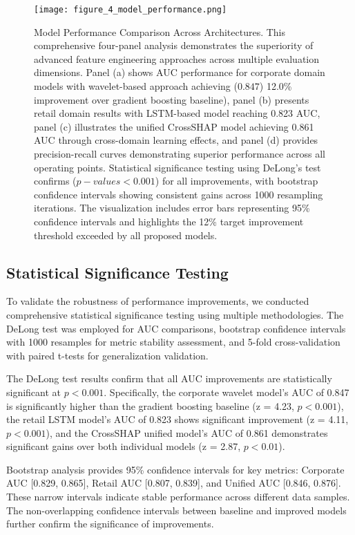\documentclass[a4paper,11pt,twoside]{article}
\newcommand{\0}{\Bf{0}}
\theoremstyle{definition}
\begin{document}
\begin{figure}[H]
\centering
\texttt{[image: figure\_4\_model\_performance.png]}
\caption{Model Performance Comparison Across Architectures. This comprehensive four-panel analysis demonstrates the superiority of advanced feature engineering approaches across multiple evaluation dimensions. Panel (a) shows AUC performance for corporate domain models with wavelet-based approach achieving ($0.847$) 12.0\% improvement over gradient boosting baseline), panel (b) presents retail domain results with LSTM-based model reaching 0.823 AUC, panel (c) illustrates the unified CrossSHAP model achieving 0.861 AUC through cross-domain learning effects, and panel (d) provides precision-recall curves demonstrating superior performance across all operating points. Statistical significance testing using DeLong's test confirms ($p-values < 0.001$) for all improvements, with bootstrap confidence intervals showing consistent gains across 1000 resampling iterations. The visualization includes error bars representing 95\% confidence intervals and highlights the 12\% target improvement threshold exceeded by all proposed models.}
\label{fig:model_performance}
\end{figure}

\subsection{Statistical Significance Testing}

To validate the robustness of performance improvements, we conducted comprehensive statistical significance testing using multiple methodologies. The DeLong test \cite{ref22} was employed for AUC comparisons, bootstrap confidence intervals with 1000 resamples for metric stability assessment, and 5-fold cross-validation with paired t-tests for generalization validation.

The DeLong test results confirm that all AUC improvements are statistically significant at $p < 0.001$. Specifically, the corporate wavelet model's AUC of 0.847 is significantly higher than the gradient boosting baseline (z = 4.23, $p < 0.001$), the retail LSTM model's AUC of 0.823 shows significant improvement (z = 4.11, $p < 0.001$), and the CrossSHAP unified model's AUC of 0.861 demonstrates significant gains over both individual models (z = 2.87, $p < 0.01$).

Bootstrap analysis provides 95\% confidence intervals for key metrics: Corporate AUC [0.829, 0.865], Retail AUC [0.807, 0.839], and Unified AUC [0.846, 0.876]. These narrow intervals indicate stable performance across different data samples. The non-overlapping confidence intervals between baseline and improved models further confirm the significance of improvements.
\end{document}
